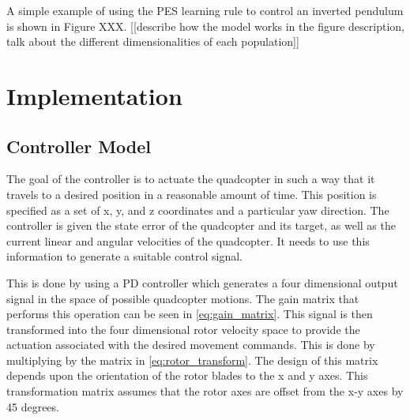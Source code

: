 \documentclass[letterpaper,12pt,titlepage,oneside,final]{book}
\begin{document}
A simple example of using the PES learning rule to control an inverted pendulum is shown in Figure XXX. [[describe how the model works in the figure description, talk about the different dimensionalities of each population]]





\chapter{Implementation} \label{chap:implementation}

\section{Controller Model}


The goal of the controller is to actuate the quadcopter in such a way that it travels to a desired position in a reasonable amount of time. 
This position is specified as a set of x, y, and z coordinates and a particular yaw direction. 
The controller is given the state error of the quadcopter and its target, as well as the current linear and angular velocities of the quadcopter. 
It needs to use this information to generate a suitable control signal.

This is done by using a PD controller which generates a four dimensional output signal in the space of possible quadcopter motions. 
The gain matrix that performs this operation can be seen in \eqref{eq:gain_matrix}. 
This signal is then transformed into the four dimensional rotor velocity space to provide the actuation associated with the desired movement commands. 
This is done by multiplying by the matrix in \eqref{eq:rotor_transform}. 
The design of this matrix depends upon the orientation of the rotor blades to the x and y axes. 
This transformation matrix assumes that the rotor axes are offset from the x-y axes by 45 degrees.
\end{document}
